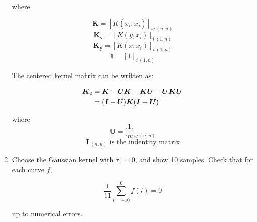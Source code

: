 \documentclass{article}
\begin{document}
\begin{enumerate}
        where  
        
        \[\bm{K} = [K(x_i,x_j)]_{ij\ (n,n)}\] 
        \[\bm{K_y} = [K(y,x_i)]_{i\ (1,n)}\]
        \[\bm{K_y} = [K(x,x_i)]_{i\ (1,n)}\]
        \[\mathbb{1} = [1]_{i\ (1,n)}\]
        
        The centered kernel matrix can be written as: 
        
        \begin{equation} 
            \begin{aligned}
                \bm{K_c} &= \bm{K} - \bm{UK} - \bm{KU} - \bm{UKU} \\
                &= (\bm{I} - \bm{U})\bm{K}(\bm{I-U}) \notag
            \end{aligned}
        \end{equation}

        where 
        \[\bm{U} = \bigg[\frac{1}{n}\bigg]_{ij\ (n,n)}\]
        \[\bm{I}_{\ (n,n)} \mbox{ is the indentity matrix}\]

    \item Choose the Gaussian kernel with $\tau=10$, and show 10 samples. Check that for each curve $f$, 
        
        \begin{equation}
            \frac{1}{11}\sum_{i=-10}^0 f(i)=0
        \end{equation}
        
        up to numerical errors.  



\end{enumerate}
\end{document}
